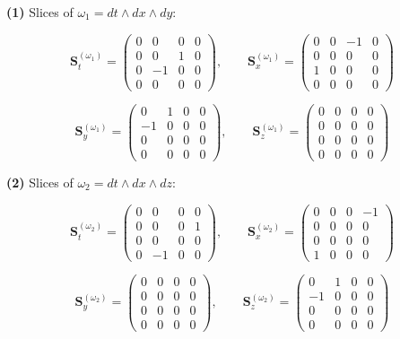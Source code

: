 \documentclass[a4paper,12pt,openany]{book}
\begin{document}
\textbf{(1)} Slices of \(\omega_1 = dt\wedge dx\wedge dy\):

\[
\mathbf{S}_{t}^{(\omega_1)}=\begin{pmatrix}0&0&0&0\\[2pt]0&0&1&0\\[2pt]0&-1&0&0\\[2pt]0&0&0&0\end{pmatrix},\qquad
\mathbf{S}_{x}^{(\omega_1)}=\begin{pmatrix}0&0&-1&0\\[2pt]0&0&0&0\\[2pt]1&0&0&0\\[2pt]0&0&0&0\end{pmatrix}
\]

\[
\mathbf{S}_{y}^{(\omega_1)}=\begin{pmatrix}0&1&0&0\\[2pt]-1&0&0&0\\[2pt]0&0&0&0\\[2pt]0&0&0&0\end{pmatrix},\qquad
\mathbf{S}_{z}^{(\omega_1)}=\begin{pmatrix}0&0&0&0\\[2pt]0&0&0&0\\[2pt]0&0&0&0\\[2pt]0&0&0&0\end{pmatrix}
\]

\textbf{(2)} Slices of \(\omega_2 = dt\wedge dx\wedge dz\):

\[
\mathbf{S}_{t}^{(\omega_2)}=\begin{pmatrix}0&0&0&0\\[2pt]0&0&0&1\\[2pt]0&0&0&0\\[2pt]0&-1&0&0\end{pmatrix},\qquad
\mathbf{S}_{x}^{(\omega_2)}=\begin{pmatrix}0&0&0&-1\\[2pt]0&0&0&0\\[2pt]0&0&0&0\\[2pt]1&0&0&0\end{pmatrix}
\]

\[
\mathbf{S}_{y}^{(\omega_2)}=\begin{pmatrix}0&0&0&0\\[2pt]0&0&0&0\\[2pt]0&0&0&0\\[2pt]0&0&0&0\end{pmatrix},\qquad
\mathbf{S}_{z}^{(\omega_2)}=\begin{pmatrix}0&1&0&0\\[2pt]-1&0&0&0\\[2pt]0&0&0&0\\[2pt]0&0&0&0\end{pmatrix}
\]
\end{document}
